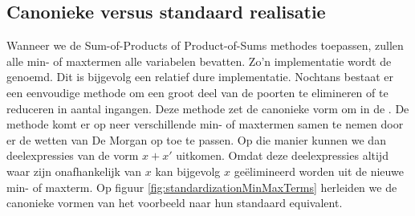 \subsection{Canonieke versus standaard realisatie}
\label{ss:canoniekestandaardrealisatie}
Wanneer we de Sum-of-Products of Product-of-Sums methodes toepassen, zullen alle min- of maxtermen alle variabelen bevatten. Zo'n implementatie wordt de  genoemd. Dit is bijgevolg een relatief dure implementatie. Nochtans bestaat er een eenvoudige methode om een groot deel van de poorten te elimineren of te reduceren in aantal ingangen. Deze methode zet de canonieke vorm om in de . De methode komt er op neer verschillende min- of maxtermen samen te nemen door er de wetten van De Morgan op toe te passen. Op die manier kunnen we dan deelexpressies van de vorm $x+x'$ uitkomen. Omdat deze deelexpressies altijd waar zijn onafhankelijk van $x$ kan bijgevolg $x$ geëlimineerd worden uit de nieuwe min- of maxterm. Op figuur \ref{fig:standardizationMinMaxTerms} herleiden we de canonieke vormen van het voorbeeld naar hun standaard equivalent.
